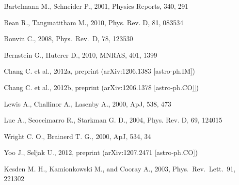 \documentclass[useAMS,fleqn,usenatbib]{mn2e}
\begin{document}
%
\begin{thebibliography}{}

  Bartelmann M., Schneider P., 2001, Physics Reports, 340, 291
 
  
  Bean R., Tangmatitham M., 2010, Phys. Rev. D, 81, 083534
  
  Bonvin C.,
  2008, Phys.\ Rev.\ D, 78, 123530


  Bernstein G., Huterer D., 2010, MNRAS, 401, 1399 


  Chang C. et al., 2012a, preprint (arXiv:1206.1383 [astro-ph.IM])
  
  Chang C. et al., 2012b, preprint (arXiv:1206.1378 [astro-ph.CO]])

     Lewis A., Challinor A., Lasenby A., 2000, ApJ, 538, 473
  
  Lue A., Scoccimarro R., Starkman G. D., 2004, Phys. Rev. D, 69, 124015
  
  Wright C. O., Brainerd T. G., 2000, ApJ, 534, 34
  
  
  Yoo J., Seljak U., 2012, preprint (arXiv:1207.2471 [astro-ph.CO])

  Kesden M. H., Kamionkowski M., and Cooray A.,
  2003, Phys.\ Rev.\ Lett.\, 91, 221302
  
  

\end{thebibliography}
\end{document}
